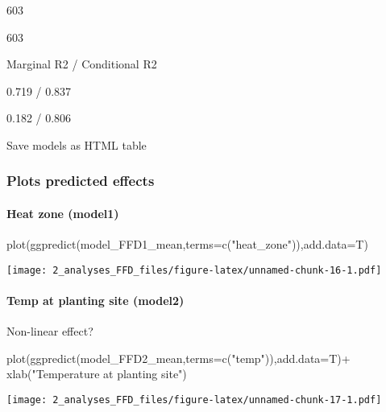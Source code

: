 \documentclass[
]{article}
\newenvironment{Shaded}{\begin{snugshade}}{\end{snugshade}}
\newcommand{\AttributeTok}[1]{\textcolor[rgb]{0.77,0.63,0.00}{#1}}
\newcommand{\FunctionTok}[1]{\textcolor[rgb]{0.00,0.00,0.00}{#1}}
\newcommand{\NormalTok}[1]{#1}
\newcommand{\SpecialCharTok}[1]{\textcolor[rgb]{0.00,0.00,0.00}{#1}}
\newcommand{\StringTok}[1]{\textcolor[rgb]{0.31,0.60,0.02}{#1}}
\begin{document}
603

603

Marginal R2 / Conditional R2

0.719 / 0.837

0.182 / 0.806

Save models as HTML table

\hypertarget{plots-predicted-effects-1}{%
\subsubsection{Plots predicted
effects}\label{plots-predicted-effects-1}}

\hypertarget{heat-zone-model1-1}{%
\paragraph{Heat zone (model1)}\label{heat-zone-model1-1}}

\begin{Shaded}
\begin{Highlighting}[]
\FunctionTok{plot}\NormalTok{(}\FunctionTok{ggpredict}\NormalTok{(model\_FFD1\_mean,}\AttributeTok{terms=}\FunctionTok{c}\NormalTok{(}\StringTok{"heat\_zone"}\NormalTok{)),}\AttributeTok{add.data=}\NormalTok{T)}
\end{Highlighting}
\end{Shaded}

\texttt{[image: 2\_analyses\_FFD\_files/figure-latex/unnamed-chunk-16-1.pdf]}

\hypertarget{temp-at-planting-site-model2-1}{%
\paragraph{Temp at planting site
(model2)}\label{temp-at-planting-site-model2-1}}

Non-linear effect?

\begin{Shaded}
\begin{Highlighting}[]
\FunctionTok{plot}\NormalTok{(}\FunctionTok{ggpredict}\NormalTok{(model\_FFD2\_mean,}\AttributeTok{terms=}\FunctionTok{c}\NormalTok{(}\StringTok{"temp"}\NormalTok{)),}\AttributeTok{add.data=}\NormalTok{T)}\SpecialCharTok{+}
  \FunctionTok{xlab}\NormalTok{(}\StringTok{"Temperature at planting site"}\NormalTok{)}
\end{Highlighting}
\end{Shaded}

\texttt{[image: 2\_analyses\_FFD\_files/figure-latex/unnamed-chunk-17-1.pdf]}
\end{document}

